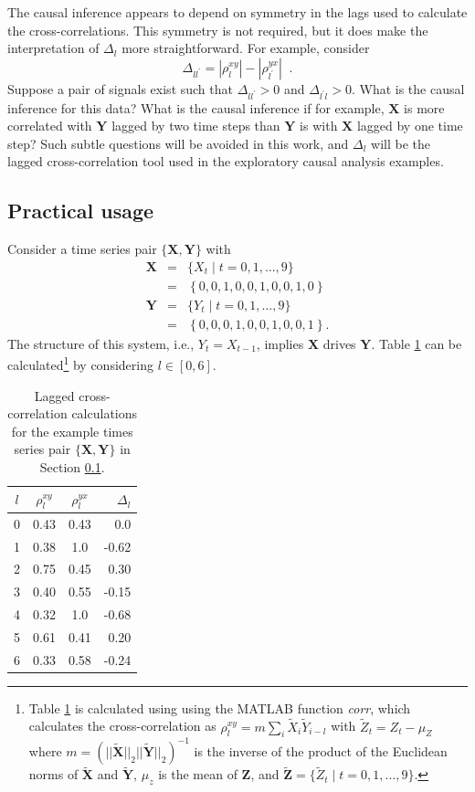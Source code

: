 The causal inference appears to depend on symmetry in the lags used to calculate the cross-correlations.  This symmetry is not required, but it does make the interpretation of $\Delta_l$ more straightforward.  For example, consider
\begin{equation}
\Delta_{ll^\prime} = |\rho^{xy}_l| - |\rho^{yx}_{l^\prime}|\;\;.
\end{equation}
Suppose a pair of signals exist such that $\Delta_{ll^\prime}>0$ and $\Delta_{l^\prime l}>0$.  What is the causal inference for this data?  What is the causal inference if for example, $\mathbf{X}$ is more correlated with $\mathbf{Y}$ lagged by two time steps than $\mathbf{Y}$ is with $\mathbf{X}$ lagged by one time step?  Such subtle questions will be avoided in this work, and $\Delta_l$ will be the lagged cross-correlation tool used in the exploratory causal analysis examples.

\subsection{Practical usage}
\label{sec:lccPUSE}
Consider a time series pair $\{\mathbf{X},\mathbf{Y}\}$ with
\begin{eqnarray*}
\mathbf{X} &=& \{X_t\; | \; t=0,1,\ldots,9\}\\
&=& \left\{0,0,1,0,0,1,0,0,1,0\right\}\\
\mathbf{Y} &=& \{Y_t\; | \; t=0,1,\ldots,9\}\\
&=& \left\{0,0,0,1,0,0,1,0,0,1\right\}.
\end{eqnarray*}
The structure of this system, i.e., $Y_t=X_{t-1}$, implies $\mathbf{X}$ drives $\mathbf{Y}$.  Table \ref{tab:lccEx} can be calculated\footnote{Table \ref{tab:lccEx} is calculated using using the {\sc MATLAB} function {\em corr}, which calculates the cross-correlation as $\rho_l^{xy} = m \sum_i \tilde{X}_i \tilde{Y}_{i-l}$ with $\tilde{Z}_t = Z_t-\mu_Z$ where $m=\left(||\tilde{\mathbf{X}}||_2||\tilde{\mathbf{Y}}||_2\right)^{-1}$ is the inverse of the product of the Euclidean norms of $\tilde{\mathbf{X}}$ and $\tilde{\mathbf{Y}}$, $\mu_z$ is the mean of $\mathbf{Z}$, and $\tilde{\mathbf{Z}} = \{\tilde{Z}_t\;|\;t=0,1,\ldots,9\}$.} by considering $l\in[0,6]$.
\begin{table}
\begin{center}
\begin{tabular}{ccc|r}
$l$ & $\rho^{xy}_l$ & $\rho^{yx}_l$ & $\Delta_l$\\
\midrule
0 & 0.43 & 0.43 & 0.0\\
1 & 0.38 & 1.0 & -0.62 \\
2 & 0.75 & 0.45 & 0.30 \\
3 & 0.40 & 0.55 & -0.15 \\
4 & 0.32 & 1.0 & -0.68 \\
5 & 0.61 & 0.41 & 0.20 \\
6 & 0.33 & 0.58 & -0.24
\end{tabular}
\caption[Lagged cross-correlation calculations]{Lagged cross-correlation calculations for the example times series pair $\{\mathbf{X},\mathbf{Y}\}$ in Section \ref{sec:lccPUSE}.}
\label{tab:lccEx}
\end{center}
\end{table}

